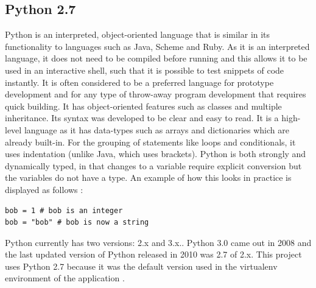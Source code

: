 \subsection{Python 2.7}
Python is an interpreted, object-oriented language that is similar in its functionality to languages such as Java, Scheme and Ruby. As it is an interpreted language, it does not need to be compiled before running and this allows it to be used in an interactive shell, such that it is possible to test snippets of code instantly. It is often considered to be a preferred language for prototype development and for any type of throw-away program development that requires quick building. It has object-oriented features such as classes and multiple inheritance. Its syntax was developed to be clear and easy to read. It is a high-level language as it has data-types such as arrays and dictionaries which are already built-in. For the grouping of statements like loops and conditionals, it uses indentation (unlike Java, which uses brackets). Python is both strongly and dynamically typed, in that changes to a variable require explicit conversion but the variables do not have a type. An example of how this looks in practice is displayed as follows \cite{pythonexample}:
\begin{verbatim}
bob = 1 # bob is an integer
bob = "bob" # bob is now a string
\end{verbatim}
Python currently has two versions: 2.x and 3.x.. Python 3.0 came out in 2008 and the last updated version of Python released in 2010 was 2.7 of 2.x.  This project uses Python 2.7 because it was the default version used in the virtualenv environment of the application \cite{python27}.

